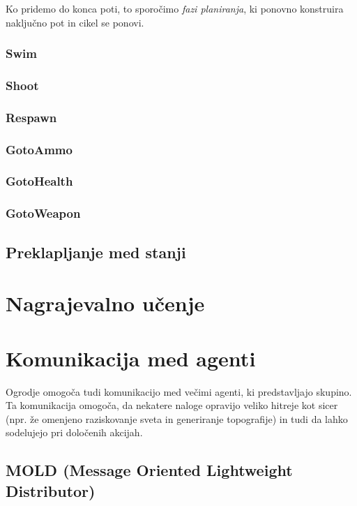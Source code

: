 \documentclass[a4paper,10pt]{article}
\begin{document}
Ko pridemo do konca poti, to sporočimo \textit{fazi planiranja}, ki ponovno konstruira naključno pot in cikel se ponovi. 
  
\subsubsection{Swim}
\subsubsection{Shoot}
\subsubsection{Respawn}
\subsubsection{GotoAmmo}
\subsubsection{GotoHealth}
\subsubsection{GotoWeapon}

\subsection{Preklapljanje med stanji}

\section{Nagrajevalno učenje}

\section{Komunikacija med agenti}

Ogrodje omogoča tudi komunikacijo med večimi agenti, ki predstavljajo skupino. Ta komunikacija omogoča, da nekatere naloge opravijo veliko hitreje kot sicer (npr. že omenjeno raziskovanje sveta in generiranje topografije) in tudi da lahko sodelujejo pri določenih akcijah.

\subsection{MOLD (Message Oriented Lightweight Distributor)}
\end{document}

